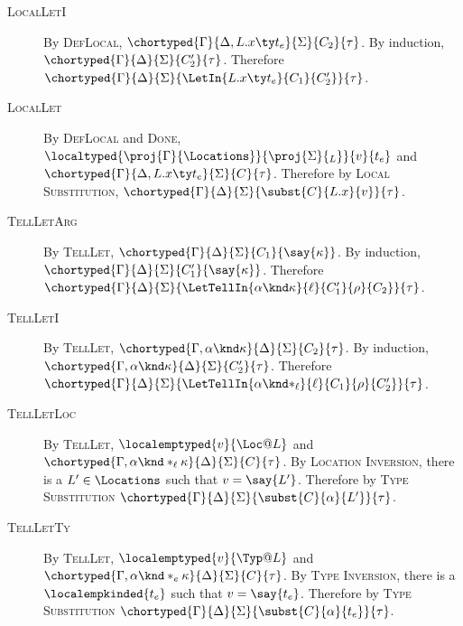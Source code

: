 \begin{description}
  \item[\textsc{LocalLetI}]
  By \textsc{DefLocal}, $\chortyped{\Gamma}{\Delta, L.x \ty t_e}{\Sigma}{C_2}{\tau}$.
  By induction, $\chortyped{\Gamma}{\Delta}{\Sigma}{C_2'}{\tau}$.
  Therefore $\chortyped{\Gamma}{\Delta}{\Sigma}{\LetIn{L.x \ty t_e}{C_1}{C_2'}}{\tau}$.

  \item[\textsc{LocalLet}]
  By \textsc{DefLocal} and \textsc{Done}, $\localtyped{\proj{\Gamma}{\Locations}}{\proj{\Sigma}{_L}}{v}{t_e}$ and $\chortyped{\Gamma}{\Delta, L.x \ty t_e}{\Sigma}{C}{\tau}$.
  Therefore by \textsc{Local Substitution}, $\chortyped{\Gamma}{\Delta}{\Sigma}{\subst{C}{L.x}{v}}{\tau}$.

  \item[\textsc{TellLetArg}]
  By \textsc{TellLet}, $\chortyped{\Gamma}{\Delta}{\Sigma}{C_1}{\say{\kappa}}$.
  By induction, $\chortyped{\Gamma}{\Delta}{\Sigma}{C_1'}{\say{\kappa}}$.
  Therefore $\chortyped{\Gamma}{\Delta}{\Sigma}{\LetTellIn{\alpha \knd \kappa}{\ell}{C_1'}{\rho}{C_2}}{\tau}$.

  \item[\textsc{TellLetI}]
  By \textsc{TellLet}, $\chortyped{\Gamma, \alpha \knd \kappa}{\Delta}{\Sigma}{C_2}{\tau}$.
  By induction, $\chortyped{\Gamma, \alpha \knd \kappa}{\Delta}{\Sigma}{C_2'}{\tau}$.
  Therefore $\chortyped{\Gamma}{\Delta}{\Sigma}{\LetTellIn{\alpha \knd *_\ell}{\ell}{C_1}{\rho}{C_2'}}{\tau}$.

  \item[\textsc{TellLetLoc}]
  By \textsc{TellLet}, $\localemptyped{v}{\Loc @ L}$ and $\chortyped{\Gamma, \alpha \knd *_\ell \kappa}{\Delta}{\Sigma}{C}{\tau}$.
  By \textsc{Location Inversion}, there is a $L' \in \Locations$ such that $v = \say{L'}$.
  Therefore by \textsc{Type Substitution} $\chortyped{\Gamma}{\Delta}{\Sigma}{\subst{C}{\alpha}{L'}}{\tau}$.

  \item[\textsc{TellLetTy}]
  By \textsc{TellLet}, $\localemptyped{v}{\Typ @ L}$ and $\chortyped{\Gamma, \alpha \knd *_e \kappa}{\Delta}{\Sigma}{C}{\tau}$.
  By \textsc{Type Inversion}, there is a $\localempkinded{t_e}$ such that $v = \say{t_e}$.
  Therefore by \textsc{Type Substitution} $\chortyped{\Gamma}{\Delta}{\Sigma}{\subst{C}{\alpha}{t_e}}{\tau}$.
\end{description}


